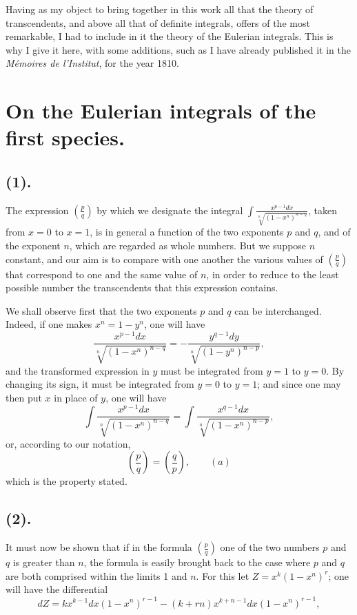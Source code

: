 \documentclass{article}
\begin{document}
Having as my object to bring together in this work all that the theory of transcendents, and above all that of definite integrals, offers of the most remarkable, I had to include in it the theory of the Eulerian integrals. This is why I give it here, with some additions, such as I have already published it in the \emph{Mémoires de l'Institut}, for the year 1810.


\section*{On the Eulerian integrals of the first species.}

\subsection*{(1).}

The expression $\left(\frac{p}{q}\right)$ by which we designate the integral $\displaystyle\int\frac{x^{p-1}dx}{\sqrt[n]{(1-x^{n})^{n-q}}}$, taken from $x=0$ to $x=1$, is in general a function of the two exponents $p$ and $q$, and of the exponent $n$, which are regarded as whole numbers. But we suppose $n$ constant, and our aim is to compare with one another the various values of $\left(\frac{p}{q}\right)$ that correspond to one and the same value of $n$, in order to reduce to the least possible number the transcendents that this expression contains.

We shall observe first that the two exponents $p$ and $q$ can be interchanged. Indeed, if one makes $x^{n}=1-y^{n}$, one will have
\[ \frac{x^{p-1}dx}{\sqrt[n]{(1-x^{n})^{n-q}}}=-\frac{y^{q-1}dy}{\sqrt[n]{(1-y^{n})^{n-p}}}, \]
and the transformed expression in $y$ must be integrated from $y=1$ to $y=0$. By changing its sign, it must be integrated from $y=0$ to $y=1$; and since one may then put $x$ in place of $y$, one will have
\[ \int\frac{x^{p-1}dx}{\sqrt[n]{(1-x^{n})^{n-q}}}=\int\frac{x^{q-1}dx}{\sqrt[n]{(1-x^{n})^{n-p}}}, \]
or, according to our notation,
\[ \left(\frac{p}{q}\right)=\left(\frac{q}{p}\right),\qquad(a) \]
which is the property stated.

\subsection*{(2).}

It must now be shown that if in the formula $\left(\frac{p}{q}\right)$ one of the two numbers $p$ and $q$ is greater than $n$, the formula is easily brought back to the case where $p$ and $q$ are both comprised within the limits 1 and $n$. For this let $Z=x^{k}(1-x^{n})^{r}$; one will have the differential
\[ dZ=kx^{k-1}dx(1-x^{n})^{r-1}-(k+rn)x^{k+n-1}dx(1-x^{n})^{r-1}, \]
\end{document}
